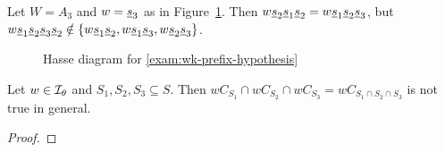 \begin{exam}
	Let $W = A_3$ and $w = \underline{s}_3$ as in Figure~\ref{fig:wk-prefix-counterexample}. Then $w \underline{s}_2 \underline{s}_1 \underline{s}_2 = w \underline{s}_1 \underline{s}_2 \underline{s}_3$, but $w \underline{s}_1 \underline{s}_2 \underline{s}_3 \underline{s}_2 \notin \{ w \underline{s}_1 \underline{s}_2, w \underline{s}_1 \underline{s}_3, w \underline{s}_2 \underline{s}_3 \}$.

	\begin{figure}[ht]
		\centering
		
		\label{fig:wk-prefix-counterexample}
		\caption{Hasse diagram for \ref{exam:wk-prefix-hypothesis}}
	\end{figure}
\end{exam}

\begin{exam}
	Let $w \in \mathcal{I}_{\theta}$ and $S_1,S_2,S_3 \subseteq S$. Then $wC_{S_1} \cap wC_{S_2} \cap wC_{S_3} = wC_{S_1 \cap S_2 \cap S_3}$ is not true in general.

	\begin{proof}
		\todo
	\end{proof}
\end{exam}